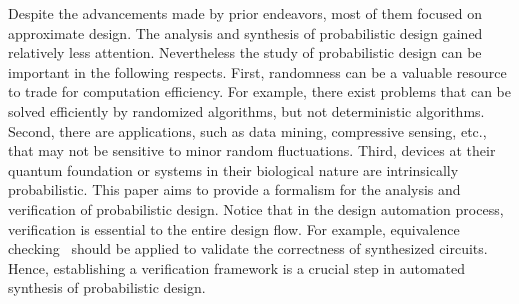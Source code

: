 Despite the advancements made by prior endeavors, most of them focused on approximate design.
The analysis and synthesis of probabilistic design gained relatively less attention.
Nevertheless the study of probabilistic design can be important in the following respects.
First, randomness can be a valuable resource to trade for computation efficiency.
For example, there exist problems that can be solved efficiently by randomized algorithms, but not deterministic algorithms.
Second, there are applications, such as data mining, compressive sensing, etc., that may not be
sensitive to minor random fluctuations.
Third, devices at their quantum foundation or systems in their biological nature are intrinsically probabilistic.
This paper aims to provide a formalism for the analysis and verification of probabilistic design.
Notice that in the design automation process, verification is essential to the entire design flow.
For example, equivalence checking~\cite{Kuehlmann1997,Mishchenko2006} should be applied to validate the correctness of synthesized circuits.
Hence, establishing a verification framework is a crucial step in automated synthesis of probabilistic design.

